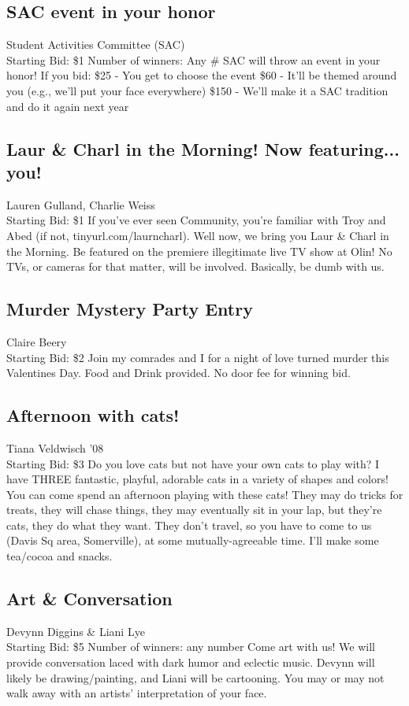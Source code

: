 \documentclass[11pt]{article}
\begin{document}
\subsection{SAC event in your honor}
Student Activities Committee (SAC)
\\
Starting Bid: \$1
\newline
Number of winners: Any \#
\newline
SAC will throw an event in your honor! If you bid:
\$25 - You get to choose the event
\$60 - It'll be themed around you (e.g., we'll put your face everywhere)
\$150 - We'll make it a SAC tradition and do it again next year
\subsection{Laur \& Charl in the Morning! Now featuring... you!}
Lauren Gulland, Charlie Weiss
\\
Starting Bid: \$1
\newline
If you've ever seen Community, you're familiar with Troy and Abed (if not, tinyurl.com/laurncharl). Well now, we bring you Laur \& Charl in the Morning. Be featured on the premiere illegitimate live TV show at Olin! No TVs, or cameras for that matter, will be involved. Basically, be dumb with us.
\subsection{Murder Mystery Party Entry}
Claire Beery
\\
Starting Bid: \$2
\newline
Join my comrades and I for a night of love turned murder this Valentines Day. Food and Drink provided. No door fee for winning bid.
\subsection{Afternoon with cats!}
Tiana Veldwisch '08
\\
Starting Bid: \$3
\newline
Do you love cats but not have your own cats to play with? I have THREE fantastic, playful, adorable cats in a variety of shapes and colors! You can come spend an afternoon playing with these cats! They may do tricks for treats, they will chase things, they may eventually sit in your lap, but they're cats, they do what they want. They don't travel, so you have to come to us (Davis Sq area, Somerville), at some mutually-agreeable time. I'll make some tea/cocoa and snacks.
\subsection{Art \& Conversation}
Devynn Diggins \& Liani Lye
\\
Starting Bid: \$5
\newline
Number of winners: any number
\newline
Come art with us!  We will provide conversation laced with dark humor and eclectic music.  Devynn will likely be drawing/painting, and Liani will be cartooning.   You may or may not walk away with an artists' interpretation of your face.
\end{document}
